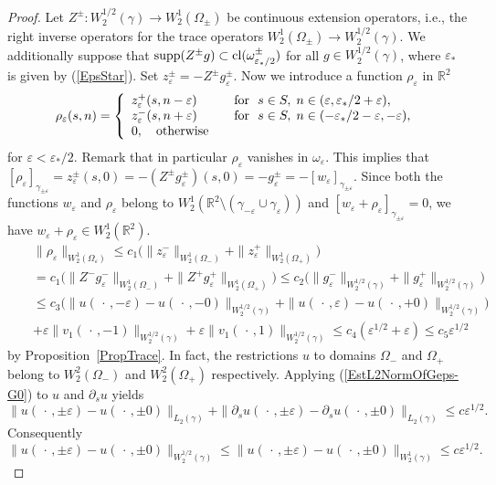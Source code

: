 \documentclass[graybox]{svmult}
\newcommand{\supp}{\mathop{\rm supp}}
\newcommand{\Real}{\mathbb R}
\newcommand{\eps}{\varepsilon}
\renewcommand{\leq}{\leqslant}
\newcommand{\eqref}[1]{(\ref{#1})}
\begin{document}
\begin{proof}
Let $Z^\pm\colon W_2^{1/2}(\gamma)\to W_2^1(\Omega_\pm)$ be  continuous extension operators, i.e., the right inverse operators for the trace operators $W_2^1(\Omega_\pm)\to W_2^{1/2}(\gamma)$.
We additionally suppose that  $\supp (Z^\pm g)\subset \mathrm{cl}(\omega_{\eps_*/2}^\pm)$ for all $g\in W_2^{1/2}(\gamma)$, where $\eps_*$ is given by \eqref{EpsStar}.
Set $z_\eps^\pm=-Z^\pm g_\eps^\pm$.
Now we introduce a function $\rho_\eps$ in $\Real^2$
\begin{equation}\label{AsymptoticsUe}
\rho_\eps(s, n)=
\left\{
  \begin{array}{ll}
    z_\eps^+(s,n-\eps)&\quad \hbox{for \ } s\in S, \; n\in (\eps, \eps_*/2+\eps ), \\
    z_\eps^-(s,n+\eps)&\quad \hbox{for \ } s\in S, \; n\in (-\eps_*/2-\eps,-\eps), \\
   0,\quad \hbox{otherwise}
  \end{array}
\right.
\end{equation}
for $\eps<\eps_*/2$. Remark that in particular $\rho_\eps$ vanishes in $\omega_\eps$. This implies that $[\rho_\eps]_{\gamma_{\pm\eps}}=z_\eps^\pm(s,0)=-(Z^\pm g_\eps^\pm)(s,0)=-g_\eps^\pm=-[w_\eps]_{\gamma_{\pm\eps}}$.
Since both the functions $w_\eps$ and $\rho_\eps$ belong to $W_2^1(\Real^2\setminus(\gamma_{-\eps}\cup \gamma_\eps))$
and $[w_\eps+\rho_\eps]_{\gamma_{\pm\eps}}=0$, we have $w_\eps+\rho_\eps\in W_2^1(\Real^2)$.
\begin{eqnarray}\nonumber
&&  \|\rho_\eps\|_{W_2^1(\Omega_\eps)}\leq c_1\big( \|z_\eps^-\|_{W_2^1(\Omega_-)} +\|z_\eps^+\|_{W_2^1(\Omega_+)}\big)\\\nonumber
&&=c_1\big(\|Z^- g_\eps^-\|_{W_2^1(\Omega_-)} +
\|Z^+ g_\eps^+\|_{W_2^1(\Omega_+)}\big)\leq c_2\big(\|g_\eps^-\|_{W_2^{1/2}(\gamma)}
+\|g_\eps^+\|_{W_2^{1/2}(\gamma)}\big)\\\nonumber
&&\leq c_3\big(\|u(\,\cdot\,,-\eps)-u(\,\cdot\,,-0)\|_{W_2^{1/2}(\gamma)}
+\|u(\,\cdot\,,\eps)-u(\,\cdot\,,+0)\|_{W_2^{1/2}(\gamma)}\big)\\\nonumber
&&+\eps \|v_1(\,\cdot\,,-1)\|_{W_2^{1/2}(\gamma)}
+\eps \|v_1(\,\cdot\,,1)\|_{W_2^{1/2}(\gamma)}\leq c_4(\eps^{1/2}+\eps)\leq c_5\eps^{1/2}
\end{eqnarray}
by Proposition~\ref{PropTrace}. In fact, the restrictions $u$ to domains $\Omega_-$ and $\Omega_+$ belong to $W_2^2(\Omega_-)$ and $W_2^2(\Omega_+)$ respectively. Applying \eqref{EstL2NormOfGeps-G0} to $u$ and $\partial_su$ yields
$$
   \|u(\,\cdot\,,\pm\eps)-u(\,\cdot\,,\pm0)\|_{L_2(\gamma)}+
   \|\partial_s u(\,\cdot\,,\pm\eps)-\partial_s u(\,\cdot\,,\pm0)\|_{L_2(\gamma)}\leq c\eps^{1/2}.
$$
Consequently
$$
  \|u(\,\cdot\,,\pm\eps)-u(\,\cdot\,,\pm0)\|_{W_2^{1/2}(\gamma)}\leq \|u(\,\cdot\,,\pm\eps)-u(\,\cdot\,,\pm0)\|_{W_2^{1}(\gamma)}\leq c\eps^{1/2}.
$$
\end{proof}
\end{document}
